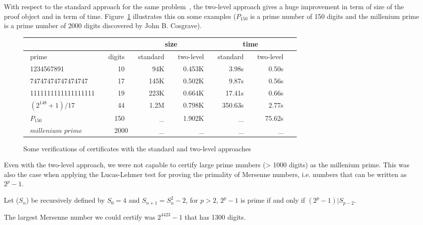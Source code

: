 With respect to the standard approach for the same 
problem~\cite{Caprotti_Oostdijk:01pockjsc}, the two-level
approach gives a huge improvement in term of size of the
proof object and in term of time.  
Figure~\ref{fig:TimeComp} illustrates this on some examples 
($P_{150}$ is a prime number of 150 digits and the millenium prime is
a prime number of 2000 digits discovered by John B. Cosgrave).
\begin{figure}
\begin{center}
\begin{tabular}{|l|r|r|r|r|r|r|}
\cline{3-6}
\multicolumn{2}{c}{} & \multicolumn{2}{|c|}{size} &
                                               \multicolumn{2}{c|}{time} \\
\hline
~prime     ~     & \multicolumn{1}{c|}{~digits~ } & ~standard~  &
  \multicolumn{1}{c|}{ ~two-level~ } &
  \multicolumn{1}{c|}{ ~standard~ } &
  \multicolumn{1}{c|}{ ~two-level~ } \\
\hline
~1234567891       ~   & 10~ &  94K~ &  ~0.453K~ & 3.98s~  & 0.50s~  \\
~74747474747474747~   & 17~ & 145K~ &  0.502K~ &   9.87s~ & 0.56s~ \\
~1111111111111111111~ & 19~ & 223K~ &  0.664K~ & 17.41s~  & 0.66s~   \\
~$(2^{148}+1)/17$ ~   & 44~ & 1.2M~ & 0.798K~ & ~350.63s~  & 2.77s~   \\
~$P_{150}$   ~        &150~ &  \_~  & 1.902K~   &  \_~   & 75.62s~  \\
~$\textit{millenium prime}$~   &2000 & \_~   & \_~      & \_~    & \_~ \\
\hline
\end{tabular}
\end{center}
\caption{Some verifications of certificates with the standard and two-level approaches}
\label{fig:TimeComp}
\end{figure} 
Even with the two-level approach, we were not capable to certify large prime numbers 
(> 1000 digits) as the millenium prime.
This was also the case when applying the Lucas-Lehmer test
for proving the primality of Mersenne numbers, 
i.e. numbers that can be written as $2 ^ p -1$.
\begin{theorem}\label{lucas}
Let ($S_n$) be recursively defined by $S_0= 4$ and $S_{n+1} = S_n^2 - 2$,
for $p > 2$, $2^p-1$ is prime if and only if $(2^p -1) | S_{p-2}$.
\end{theorem}
The largest Mersenne number we could certify was $2^{4423} - 1$ that has 1300 digits. 

